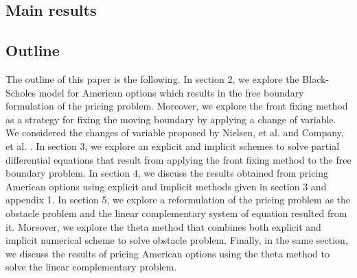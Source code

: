 \subsection{Main results}

\subsection{Outline}

The outline of this paper is the following. In section 2, we explore the 
Black-Scholes model for American options which results in the free boundary 
formulation of the pricing problem. Moreover, we explore the front fixing method
as a strategy for fixing the moving boundary by applying a change of variable. 
We considered the changes of variable proposed by Nielsen, et al. \cite*{nielsen_2001} 
and Company, et al. \cite*{company_egorova_jodar_2014}. In section 3, we explore
an explicit and implicit schemes to solve partial differential equations that 
result from applying the front fixing method to the free boundary problem. 
In section 4, we discuss the results obtained from pricing American options using
explicit and implicit methods given in section 3 and appendix 1. In section 5, 
we explore a reformulation of the pricing problem as the obstacle problem and 
the linear complementary system of equation resulted from it. Moreover, we 
explore the theta method that combines both explicit and implicit numerical 
scheme to solve obstacle problem. Finally, in the same section, we discuss the 
results of pricing American options using the theta method to solve the linear 
complementary problem.

